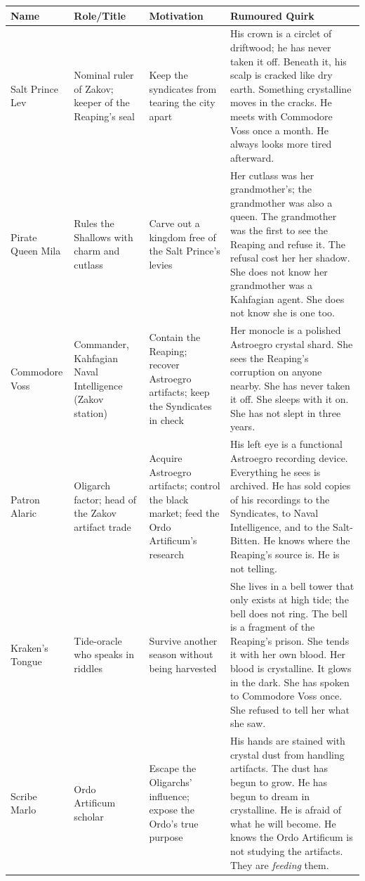 \documentclass[12pt,oneside]{book}
\begin{document}
\begin{longtable}{|p{}|p{}|p{}|p{}|}
\hline
\textbf{Name} & \textbf{Role/Title} & \textbf{Motivation} & \textbf{Rumoured Quirk} \\
\hline
Salt Prince Lev & Nominal ruler of Zakov; keeper of the Reaping's seal & Keep the syndicates from tearing the city apart & His crown is a circlet of driftwood; he has never taken it off. Beneath it, his scalp is cracked like dry earth. Something crystalline moves in the cracks. He meets with Commodore Voss once a month. He always looks more tired afterward. \\
\hline
Pirate Queen Mila & Rules the Shallows with charm and cutlass & Carve out a kingdom free of the Salt Prince's levies & Her cutlass was her grandmother's; the grandmother was also a queen. The grandmother was the first to see the Reaping and refuse it. The refusal cost her her shadow. She does not know her grandmother was a Kahfagian agent. She does not know she is one too. \\
\hline
Commodore Voss & Commander, Kahfagian Naval Intelligence (Zakov station) & Contain the Reaping; recover Astroegro artifacts; keep the Syndicates in check & Her monocle is a polished Astroegro crystal shard. She sees the Reaping's corruption on anyone nearby. She has never taken it off. She sleeps with it on. She has not slept in three years. \\
\hline
Patron Alaric & Oligarch factor; head of the Zakov artifact trade & Acquire Astroegro artifacts; control the black market; feed the Ordo Artificum's research & His left eye is a functional Astroegro recording device. Everything he sees is archived. He has sold copies of his recordings to the Syndicates, to Naval Intelligence, and to the Salt-Bitten. He knows where the Reaping's source is. He is not telling. \\
\hline
Kraken's Tongue & Tide-oracle who speaks in riddles & Survive another season without being harvested & She lives in a bell tower that only exists at high tide; the bell does not ring. The bell is a fragment of the Reaping's prison. She tends it with her own blood. Her blood is crystalline. It glows in the dark. She has spoken to Commodore Voss once. She refused to tell her what she saw. \\
\hline
Scribe Marlo & Ordo Artificum scholar & Escape the Oligarchs' influence; expose the Ordo's true purpose & His hands are stained with crystal dust from handling artifacts. The dust has begun to grow. He has begun to dream in crystalline. He is afraid of what he will become. He knows the Ordo Artificum is not studying the artifacts. They are \textit{feeding} them. \\

\end{longtable}
\end{document}
